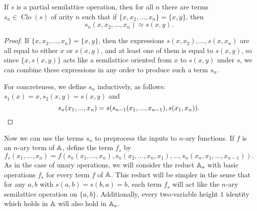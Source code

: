 \documentclass[letterpaper,11pt]{article}
\DeclareMathOperator{\Clo}{Clo}
\begin{document}
\begin{prop}\label{higher-semilattice} If $s$ is a partial semilattice operation, then for all $n$ there are terms $s_n \in \Clo(s)$ of arity $n$ such that if $\{x,x_2, ..., x_n\} = \{x,y\}$, then
\[
s_n(x,x_2, ..., x_n) \approx s(x,y).
\]
\end{prop}
\begin{proof} If $\{x,x_2, ..., x_n\} = \{x,y\}$, then the expressions $s(x,x_2), ..., s(x,x_n)$ are all equal to either $x$ or $s(x,y)$, and at least one of them is equal to $s(x,y)$, so since $\{x,s(x,y)\}$ acts like a semilattice oriented from $x$ to $s(x,y)$ under $s$, we can combine these expressions in any order to produce such a term $s_n$.

For concreteness, we define $s_n$ inductively, as follows: $s_1(x) = x, s_2(x,y) = s(x,y)$ and
\[
s_n(x_1, ..., x_n) = s(s_{n-1}(x_1, ..., x_{n-1}), s(x_1,x_n)).\qedhere
\]
\end{proof}

Now we can use the terms $s_n$ to preprocess the inputs to $n$-ary functions. If $f$ is an $n$-ary term of $\mathbb{A}$, define the term $f_s$ by
\[
f_s(x_1, ..., x_n) = f(s_n(x_1, ..., x_n), s_n(x_2, ..., x_n, x_1), ..., s_n(x_n, x_1, ..., x_{n-1})).
\]
As in the case of unary operations, we will consider the reduct $\mathbb{A}_s$ with basic operations $f_s$ for every term $f$ of $\mathbb{A}$. This reduct will be simpler in the sense that for any $a,b$ with $s(a,b) = s(b,a) = b$, each term $f_s$ will act like the $n$-ary semilattice operation on $\{a,b\}$. Additionally, every two-variable height $1$ identity which holds in $\mathbb{A}$ will also hold in $\mathbb{A}_s$.
\end{document}
